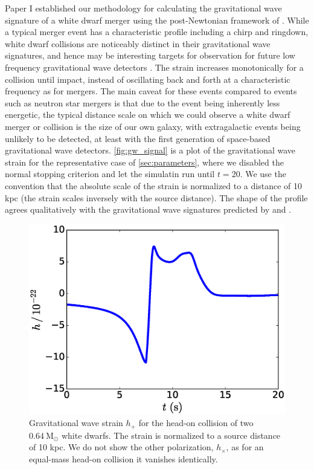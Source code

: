 \documentclass[twocolumn,numberedappendix]{../aastex6}
\newcommand{\msolar}{\mathrm{M}_\odot}
\begin{document}
Paper I established our methodology for calculating the gravitational wave signature
of a white dwarf merger using the post-Newtonian framework of \citet{blanchet:1990}.
While a typical merger event has a characteristic profile including a chirp and ringdown,
white dwarf collisions are noticeably distinct in their gravitational wave signatures, and
hence may be interesting targets for observation for future low frequency gravitational
wave detectors \citep{eLISA}. The strain increases monotonically for a collision until impact,
instead of oscillating back and forth at a characteristic frequency as for mergers.
The main caveat for these events compared to events
such as neutron star mergers is that due to the event being inherently less energetic,
the typical distance scale on which we could observe a white dwarf merger or collision
is the size of our own galaxy, with extragalactic events being unlikely to be
detected, at least with the first generation of space-based gravitational wave
detectors. \autoref{fig:gw_signal} is a plot of the gravitational wave strain for
the representative case of \autoref{sec:parameters}, where we disabled the normal stopping
criterion and let the simulatin run until $t = 20$. We use the convention that the
absolute scale of the strain is normalized to a distance of 10 kpc (the strain scales
inversely with the source distance). The shape of the profile agrees qualitatively
with the gravitational wave signatures predicted by \cite{loren-aguilar:2009:collisions}
and \cite{garcia-senz:2013}.

\begin{figure}
  \centering
  \includegraphics[scale=0.425]{plots/gw_signal}
  \caption{Gravitational wave strain $h_+$ for the head-on collision of two $0.64\ \msolar$
           white dwarfs. The strain is normalized to a source distance of 10 kpc. We do not
           show the other polarization, $h_\times$, as for an equal-mass head-on collision it vanishes
           identically.
           \label{fig:gw_signal}}
\end{figure}
\end{document}
